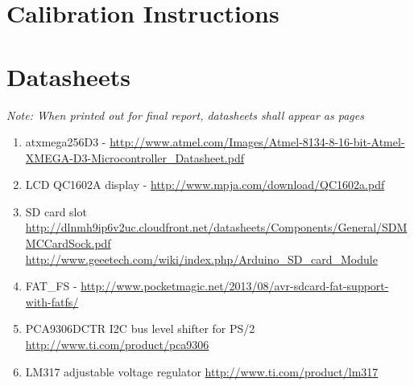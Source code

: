 \documentclass[bibtotocnumbered,abstract=on,paper=a4,fontsize=12pt,parskip=on,halfparskip=on]{scrartcl}		%
\begin{document}
  \clearpage
\section{Calibration Instructions}
  \clearpage
\section{Datasheets}
  \textit{Note: When printed out for final report, datasheets shall appear as pages}
  \begin{enumerate}
    \item{atxmega256D3 - \scriptsize\url{http://www.atmel.com/Images/Atmel-8134-8-16-bit-Atmel-XMEGA-D3-Microcontroller\_Datasheet.pdf}}
    \item{LCD QC1602A display - \scriptsize\url{http://www.mpja.com/download/QC1602a.pdf}}
    \item{SD card slot \scriptsize\url{http://dlnmh9ip6v2uc.cloudfront.net/datasheets/Components/General/SDMMCCardSock.pdf}
      \scriptsize\url{http://www.geeetech.com/wiki/index.php/Arduino\_SD\_card\_Module}}
    \item{FAT\_FS - \scriptsize\url{http://www.pocketmagic.net/2013/08/avr-sdcard-fat-support-with-fatfs/}}
    \item{PCA9306DCTR I2C bus level shifter for PS/2 \scriptsize\url{http://www.ti.com/product/pca9306}}
    \item{LM317 adjustable voltage regulator \scriptsize\url{http://www.ti.com/product/lm317}}
  \end{enumerate}
  \clearpage
\end{document}
